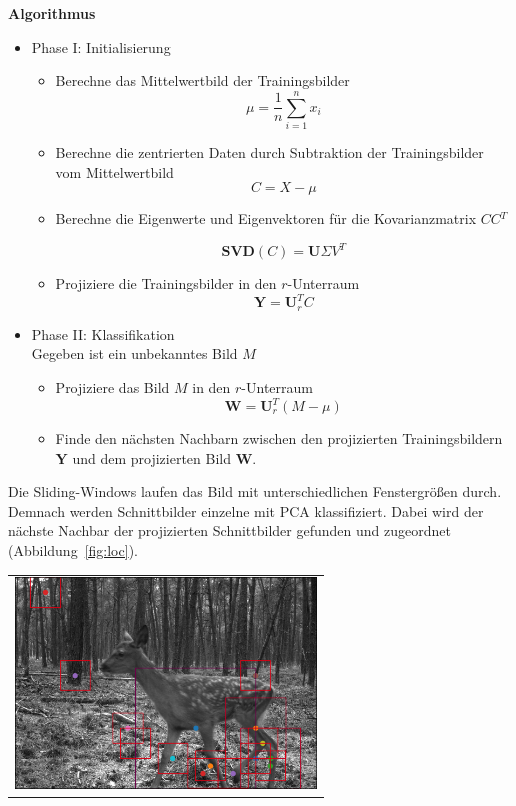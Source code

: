 \textbf{Algorithmus}
\begin{itemize}
\item{Phase I: Initialisierung}
\begin{itemize}
\item{Berechne das Mittelwertbild der Trainingsbilder}
\begin{equation}
\mu = \frac{1}{n}\sum^n_{i=1}{x_i} 
\end{equation}
\item{Berechne die zentrierten Daten durch Subtraktion der Trainingsbilder vom Mittelwertbild}
\begin{equation}
C = X - \mu
\end{equation}
\item{Berechne die Eigenwerte und Eigenvektoren für die Kovarianzmatrix $CC$$^T$}

\begin{equation}
\mathbf{SVD}(C) =\mathbf{U} \Sigma V^T 
\end{equation}
\item{Projiziere die Trainingsbilder in den $r$-Unterraum}
\begin{equation}
\mathbf{Y}=\mathbf{U}^{T}_{r}C
\end{equation}
\end{itemize}
\item{Phase II: Klassifikation}\\
Gegeben ist ein unbekanntes Bild  $M$
\begin{itemize}
\item{Projiziere das Bild $M$ in den $r$-Unterraum}
\begin{equation}
\mathbf{W}=\mathbf{U}^{T}_{r} (M - \mu)
\end{equation}
\item{Finde den nächsten Nachbarn zwischen den projizierten Trainingsbildern $\mathbf{Y}$ und dem projizierten Bild $\mathbf{W}$}.
\end{itemize}
\end{itemize}
Die Sliding-Windows laufen das Bild mit unterschiedlichen Fenstergrößen durch. Demnach werden Schnittbilder einzelne mit PCA klassifiziert. Dabei wird der nächste Nachbar der projizierten Schnittbilder gefunden und zugeordnet (Abbildung~\ref{fig:loc}).

\begin{center}
\begin{tabular}{c}
\includegraphics[width=8cm]{img/Segmentierung/localisation}
\end{tabular}
\label{fig:loc}
\end{center}

